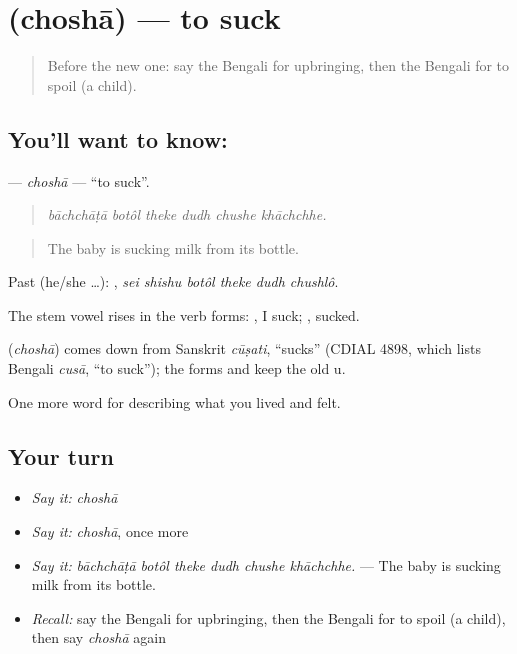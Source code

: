 \section[\texorpdfstring{\bn{চোষা} (choshā)}{চোষা (choshā)}]{ (choshā) — to suck}

\label{lesson:BN-C486-chosha}



\begin{quote}
Before the new one: say the Bengali for upbringing, then the Bengali for to spoil (a child).
\end{quote}

\subsection*{You'll want to know: }
\textbf{} — \emph{choshā} — \textquotedblleft{}to suck\textquotedblright{}.

\begin{quote}
     
\end{quote}

\begin{quote}
\emph{bāchchāṭā botôl theke dudh chushe khāchchhe.}
\end{quote}

\begin{quote}
The baby is sucking milk from its bottle.
\end{quote}

Past (he/she …):      , \emph{sei shishu botôl theke dudh chushlô}.

The stem vowel rises in the verb forms: , I suck; , sucked.

\begin{cousinweb}
\textbf{} (\emph{choshā}) comes down from Sanskrit \emph{cūṣati}, \textquotedblleft{}sucks\textquotedblright{} (CDIAL 4898, which lists Bengali \emph{cusā}, \textquotedblleft{}to suck\textquotedblright{}); the forms  and  keep the old u.
\end{cousinweb}

\begin{grammarlens}[title={What you've built}]
One more word for describing what you lived and felt.
\end{grammarlens}

\subsection*{Your turn}
\begin{itemize}
\raggedright
  \item \emph{Say it:} \emph{choshā}
  \item \emph{Say it:} \emph{choshā}, once more
  \item \emph{Say it:} \emph{bāchchāṭā botôl theke dudh chushe khāchchhe.} — The baby is sucking milk from its bottle.
  \item \emph{Recall:} say the Bengali for upbringing, then the Bengali for to spoil (a child), then say \emph{choshā} again
\end{itemize}

